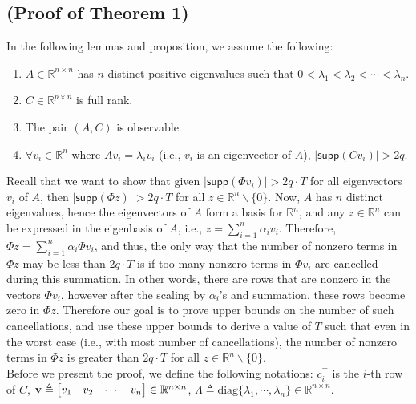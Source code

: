 \subsection*{(Proof of Theorem 1)}
\vspace{-0.4cm}
In the following lemmas and proposition, we assume the following:
\vspace{-0.4cm}
\begin{enumerate}
\item $A \in \mathbb{R}^{n\times n}$ has $n$ distinct positive eigenvalues such that $0 < \lambda_1 < \lambda_2 < \cdots < \lambda_n$.%
\item $C \in \mathbb{R}^{p \times n}$ is full rank. 
\item The pair $(A,C)$ is observable.
\item $\forall v_i \in \mathbb{R}^n$ where  $ Av_i = \lambda_i v_i $ (i.e., $v_i$ is an eigenvector of $A$), $ \lvert \textsf{supp}(Cv_i) \rvert > 2q$.
\end{enumerate}
\vspace{-0.4cm}                                
Recall that we want to show that given $\lvert \textsf{supp} (\Phi v_i) \rvert > 2q\cdot T $ for all eigenvectors $v_i$ of $A$, then $\lvert \textsf{supp} (\Phi z) \rvert > 2q\cdot T $ for all $z \in \mathbb{R}^n \backslash \{0\}$. Now, $A$ has $n$ distinct eigenvalues, hence the eigenvectors of $A$ form a basis for $\mathbb{R}^n$, and any $z \in \mathbb{R}^n$ can be expressed in the eigenbasis of $A$, i.e., $ z = \sum_{i=1}^n \alpha_i v_i$. Therefore, $\Phi z = \sum_{i=1}^n \alpha_i \Phi v_i$, and thus, the only way that the number of nonzero terms in $\Phi z$ may be less than $2q\cdot T$ is if too many nonzero terms in $\Phi v_i$ are cancelled during this summation. 
In other words, there are rows that are nonzero in the vectors $\Phi v_i$, however after the scaling by $\alpha_i$'s and summation, these rows become zero in $\Phi z$. Therefore our goal is to prove upper bounds on the number of such cancellations, and use these upper bounds to derive a value of $T$ such that even in the worst case (i.e., with most number of cancellations), the number of nonzero terms in $\Phi z$ is greater than $2q\cdot T$ for all $z \in \mathbb{R}^n \backslash \{0\}$.
\\
Before we present the proof, we define the following notations: $c_i^\top$ is the $i$-th row of $C$, ${\bf v} \triangleq \begin{bmatrix} v_1 & v_2 & \cdots & v_n \end{bmatrix} \in \mathbb{R}^{n \times n}$, $\Lambda \triangleq \text{diag}\{ \lambda_1, \cdots , \lambda_n \} \in \mathbb{R}^{n \times n}$. %
